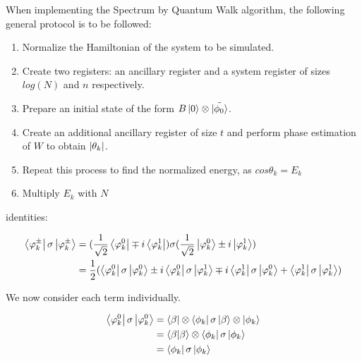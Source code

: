 When implementing the Spectrum by Quantum Walk algorithm, the following general protocol is to be followed:

\begin{enumerate}
  \item Normalize the Hamiltonian of the system to be simulated.
  \item Create two registers: an ancillary register and a system register of sizes $log(N)$ and $n$ respectively.
  \item Prepare an initial state of the form $ B \left\vert{0}\right\rangle \otimes \tilde{\left\vert{\phi_0}\right\rangle}$.
  \item Create an additional ancillary register of size $t$ and perform phase estimation of $W$ to obtain $\abs{\theta_k}$.
  \item Repeat this process to find the normalized energy, as $cos \theta_k = E_k$
  \item Multiply $E_k$ with $N$
\end{enumerate}


identities:

\newpage

\begin{align} \begin{split}
\left\langle{\varphi_k^{\pm}}\right\vert \sigma \left\vert{\varphi_k^{\pm}}\right\rangle &= (\frac{1}{\sqrt{2}}\left\langle{\varphi_k^0}\right\vert \mp i \left\langle{\varphi_k^1}\right\vert) \sigma (\frac{1}{\sqrt{2}} \left\vert{\varphi_k^0}\right\rangle \pm i \left\vert{\varphi_k^1}\right\rangle)\\
&= \frac{1}{2}(\left\langle{\varphi_k^0}\right\vert \sigma \left\vert{\varphi_k^0}\right\rangle \pm i \left\langle{\varphi_k^0}\right\vert \sigma \left\vert{\varphi_k^1}\right\rangle \mp i \left\langle{\varphi_k^1}\right\vert \sigma \left\vert{\varphi_k^0}\right\rangle + \left\langle{\varphi_k^1}\right\vert \sigma \left\vert{\varphi_k^1}\right\rangle)\\
\end{split}\end{align}

We now consider each term individually.

\begin{align} \begin{split}
  \left\langle{\varphi_k^0}\right\vert \sigma \left\vert{\varphi_k^0}\right\rangle &= \left\langle{\beta}\right\vert \otimes \left\langle{\phi_k}\right\vert \sigma \left\vert{\beta}\right\rangle \otimes \left\vert{\phi_k}\right\rangle\\
  &= \braket{\beta}{\beta} \otimes \left\langle{\phi_k}\right\vert \sigma \left\vert{\phi_k}\right\rangle\\
  &= \left\langle{\phi_k}\right\vert \sigma \left\vert{\phi_k}\right\rangle
\end{split} \end{align}


